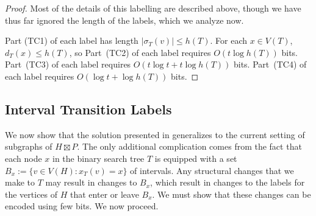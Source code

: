\documentclass[kpfonts]{patmorin}
\let\le\leqslant
\begin{document}
\begin{proof}
  Most of the details of this labelling are described above, though we have thus far ignored the length of the labels, which we analyze now.
  
  Part (TC1) of each label has length $|\sigma_T(v)|\le h(T)$.  For each $x\in V(T)$, $d_T(x)\le h(T)$, so Part~(TC2) of each label requires $O(t\log h(T))$ bits.  Part~(TC3) of each label requires $O(t\log t + t\log h(T))$ bits.  Part~(TC4) of each label requires $O(\log t + \log h(T))$ bits.
\end{proof}

% 

\subsection{Interval Transition Labels}


We now show that the solution presented in  generalizes to the current setting of subgraphs of $H\boxtimes P$.  The only additional complication comes from the fact that each node $x$ in the binary search tree $T$ is equipped with a set $B_x:=\{v\in V(H):x_T(v)=x\}$ of intervals.  Any structural changes that we make to $T$ may result in changes to $B_x$, which result in changes to the labels for the vertices of $H$ that enter or leave $B_x$.  We must show that these changes can be encoded using few bits.  We now proceed.
\end{document}
